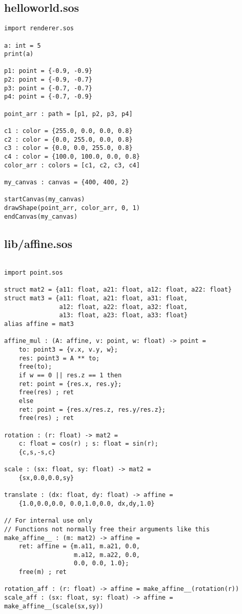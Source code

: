 \documentclass[main.tex]{subfiles}
\begin{document}
\subsection{helloworld.sos}
\begin{lstlisting}
import renderer.sos

a: int = 5
print(a)

p1: point = {-0.9, -0.9}
p2: point = {-0.9, -0.7}
p3: point = {-0.7, -0.7}
p4: point = {-0.7, -0.9}

point_arr : path = [p1, p2, p3, p4]

c1 : color = {255.0, 0.0, 0.0, 0.8}
c2 : color = {0.0, 255.0, 0.0, 0.8}
c3 : color = {0.0, 0.0, 255.0, 0.8}
c4 : color = {100.0, 100.0, 0.0, 0.8}
color_arr : colors = [c1, c2, c3, c4]

my_canvas : canvas = {400, 400, 2}

startCanvas(my_canvas)
drawShape(point_arr, color_arr, 0, 1)
endCanvas(my_canvas)
\end{lstlisting}

\subsection{lib/affine.sos}

\begin{lstlisting}

import point.sos

struct mat2 = {a11: float, a21: float, a12: float, a22: float}
struct mat3 = {a11: float, a21: float, a31: float,
               a12: float, a22: float, a32: float,
               a13: float, a23: float, a33: float}
alias affine = mat3

affine_mul : (A: affine, v: point, w: float) -> point =
    to: point3 = {v.x, v.y, w};
    res: point3 = A ** to;
    free(to);
    if w == 0 || res.z == 1 then
    ret: point = {res.x, res.y};
    free(res) ; ret
    else
    ret: point = {res.x/res.z, res.y/res.z};
    free(res) ; ret

rotation : (r: float) -> mat2 = 
    c: float = cos(r) ; s: float = sin(r);
    {c,s,-s,c}

scale : (sx: float, sy: float) -> mat2 = 
    {sx,0.0,0.0,sy}

translate : (dx: float, dy: float) -> affine =
    {1.0,0.0,0.0, 0.0,1.0,0.0, dx,dy,1.0}

// For internal use only
// Functions not normally free their arguments like this
make_affine__ : (m: mat2) -> affine = 
    ret: affine = {m.a11, m.a21, 0.0,
                   m.a12, m.a22, 0.0,
                   0.0, 0.0, 1.0};
    free(m) ; ret

rotation_aff : (r: float) -> affine = make_affine__(rotation(r))
scale_aff : (sx: float, sy: float) -> affine = make_affine__(scale(sx,sy))
\end{lstlisting}
\end{document}
